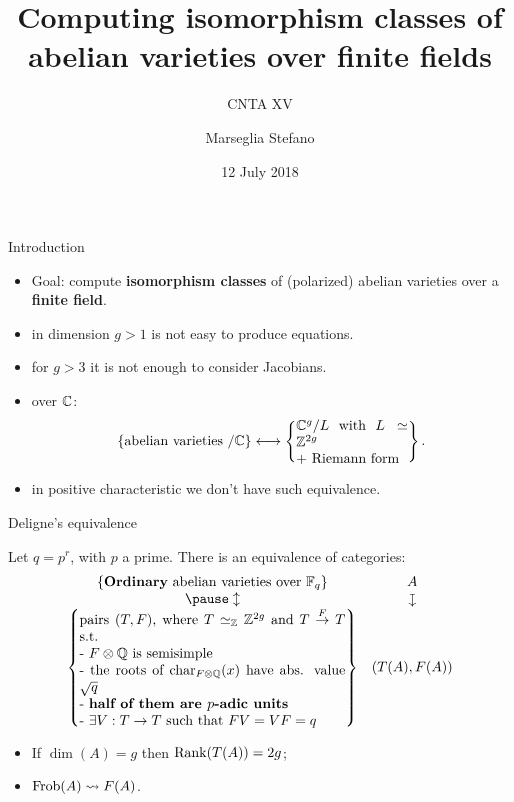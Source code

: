 \documentclass{beamer}
\title[]{Computing isomorphism classes of abelian varieties over finite fields}
\subtitle{CNTA XV}
\author[Marseglia Stefano]{Marseglia Stefano}
\institute[]{Stockholms Universitet}
\date{12 July 2018}
\begin{document}
\begin{frame}
\titlepage
\end{frame}

\begin{frame}{ Introduction }
\begin{itemize}
 \item Goal: compute \textbf{isomorphism classes} of (polarized) abelian varieties over a \textbf{finite field}.
 \pause \item in dimension $g>1$ is not easy to produce equations.
 \pause \item for $g>3$ it is not enough to consider Jacobians.
 \pause \item over $\mathbb{C}$:
 \[
      \set{ \text{abelian varieties $/\C$} } \longleftrightarrow 
      \set{\parbox[c]{8em}{$\C^g/L$ with $L\simeq \Z^{2g}$\\ $+$ Riemann form}}.
 \]
 \pause \vspace{-6mm} \item in positive characteristic we don't have such equivalence.
\end{itemize}
\end{frame}

\begin{frame}{ Deligne's equivalence }
\begin{theorem}[Deligne '69]
Let $q=p^r$, with $p$ a prime. There is an equivalence of categories:
\[\begin{array}{cc}
\set{\text{\textbf{Ordinary} abelian varieties over $\F_q$}}	& A \\
\pause \updownarrow							& \downmapsto \\
\set{\parbox[p]{19em}{pairs $(T,F)$, where $T\simeq_\Z \Z^{2g}$ and $T\overset{F}{\to} T$ s.t.\\
- $F\otimes \Q$ is semisimple\\
- the roots of $\Char_{F\otimes\Q}(x)$ have abs. value $\sqrt{q}$\\
- \textbf{half of them are $p$-adic units}\\
- $\exists V:T\to T$ such that $FV=VF=q$
}}	& (T(A),F(A))
\end{array}\]
\end{theorem}
\pause
\begin{remark}
\begin{itemize}
 \item If $\dim(A)=g$ then $\operatorname{Rank}(T(A))=2g$;
 \item $\operatorname{Frob}(A)\rightsquigarrow F(A)$.
\end{itemize}
\end{remark}
\end{frame}
\end{document}
